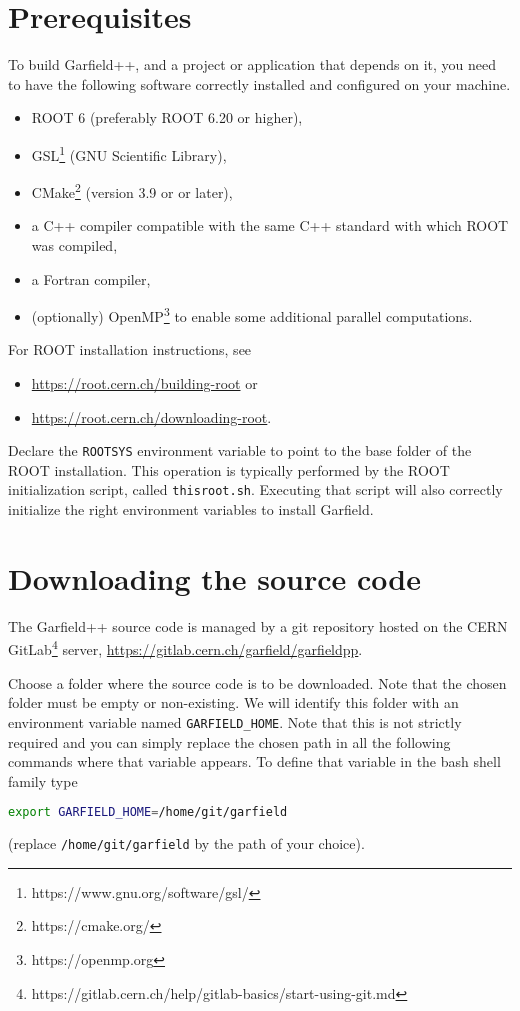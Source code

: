 \section{Prerequisites}

To build Garfield++, and a project or application that depends on it, 
you need to have the following software correctly installed and 
configured on your machine.
\begin{itemize}
	\item ROOT 6 (preferably ROOT 6.20 or higher), 
  \item GSL\footnote{https://www.gnu.org/software/gsl/} (GNU Scientific Library),
	\item CMake\footnote{https://cmake.org/} (version 3.9 or or later),
	\item a C++ compiler compatible with the same C++ standard with which ROOT was compiled,
	\item a Fortran compiler,
	\item (optionally) OpenMP\footnote{https://openmp.org} to enable some additional parallel computations. 
\end{itemize}

For ROOT installation instructions, see 
\begin{itemize}
  \item
  \url{https://root.cern.ch/building-root} or
  \item
  \url{https://root.cern.ch/downloading-root}.
\end{itemize} 
Declare the \texttt{ROOTSYS} environment variable to point to the 
base folder of the ROOT installation. 
This operation is typically performed by the ROOT initialization script, 
called \texttt{thisroot.sh}. 
Executing that script will also correctly initialize the 
right environment variables to install Garfield.

\section{Downloading the source code}
The Garfield++ source code is managed by a git repository hosted on the CERN GitLab\footnote{https://gitlab.cern.ch/help/gitlab-basics/start-using-git.md} server,
\url{https://gitlab.cern.ch/garfield/garfieldpp}.

Choose a folder where the source code is to be downloaded. 
Note that the chosen folder must be empty or non-existing. 
We will identify this folder with an environment variable named 
\texttt{GARFIELD\_HOME}. 
Note that this is not strictly required and you can simply replace the 
chosen path in all the following commands where that variable appears. 
To define that variable in the bash shell family type
\begin{lstlisting}[language=bash]
export GARFIELD_HOME=/home/git/garfield
\end{lstlisting} 
(replace \texttt{/home/git/garfield} by the path of your choice).

